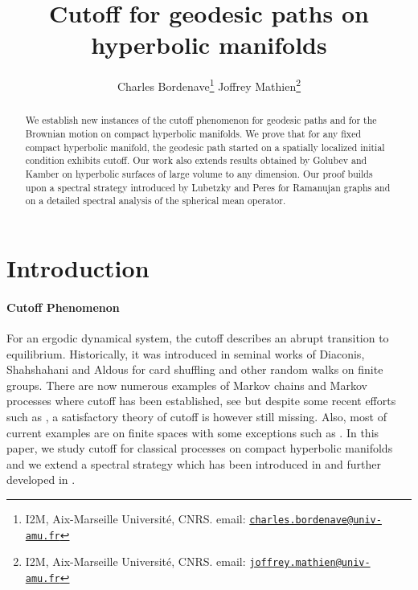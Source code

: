 \documentclass[]{scrartcl}
\title{Cutoff for geodesic paths 
on hyperbolic manifolds}
\author{Charles Bordenave\thanks{I2M, Aix-Marseille Université, CNRS. email:  \href{mailto:charles.bordenaven@univ-amu.fr}{\texttt{charles.bordenave@univ-amu.fr}}} \quad   \quad  Joffrey Mathien\thanks{I2M, Aix-Marseille Université, CNRS. email:  \href{mailto:joffrey.mathien@univ-amu.fr}{\texttt{joffrey.mathien@univ-amu.fr}}}}
\date{}
\numberwithin{equation}{section}
\numberwithin{figure}{section}
\begin{document}
	\maketitle
	
	\begin{abstract}
We establish new instances of the cutoff phenomenon for geodesic paths and for the Brownian motion on compact hyperbolic manifolds. We prove that for any fixed compact hyperbolic manifold, the geodesic path started on a spatially localized initial condition exhibits cutoff. Our work also extends results obtained by Golubev and Kamber on hyperbolic surfaces of large volume to any dimension. Our proof  builds upon a spectral strategy introduced by Lubetzky and Peres for Ramanujan graphs and on a detailed spectral analysis of the spherical mean operator. 
	\end{abstract}
	
	
	\section{Introduction}
	
		\paragraph{Cutoff Phenomenon} For an ergodic dynamical system, the cutoff describes an abrupt transition to equilibrium. Historically, it was introduced in seminal works of  Diaconis, Shahshahani and Aldous \cite{diaconis1981generating,aldous1983mixing,aldous1986shuffling} for card shuffling and other random walks on finite groups. 
	There are now numerous examples of Markov chains and Markov processes where cutoff has been established, see \cite{diaconis1996cutoff,MR3726904} but despite some recent efforts such as \cite{MR2375599,MR3650406,MR4476123,MR4780485}, a satisfactory theory of cutoff is however still missing. Also, most of current examples are on finite spaces with some exceptions such as \cite{MR2375599,MR3201989,Golubev,10.1214/20-EJP417,Boursier_2022}. In this paper, we study cutoff for classical processes on compact hyperbolic manifolds and we extend a spectral strategy which has been introduced in \cite{MR3558308} and further developed in \cite{Golubev,MR4167012,MR4476123,MR4400017}. 
		
		
		
\end{document}
